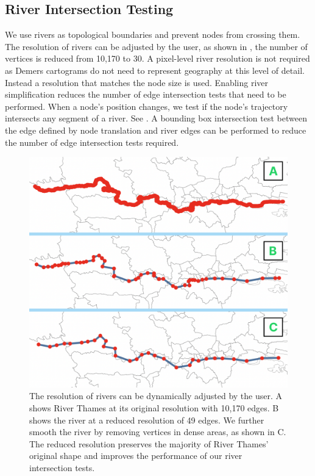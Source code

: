     

\subsection{River Intersection Testing}

We use rivers as topological boundaries and prevent nodes from crossing them. The resolution of rivers can be adjusted by the user, as shown in , the number of vertices is reduced from 10,170 to 30. A pixel-level river resolution is not required as Demers cartograms do not need to represent geography at this level of detail. Instead a resolution that matches the node size is used. Enabling river simplification reduces the number of edge intersection tests that need to be performed. When a node's position changes, we test if the node's trajectory intersects any segment of a river. See . A bounding box intersection test between the edge defined by node translation and river edges can be performed to reduce the number of edge intersection tests required.


{
\begin{figure}[tb!]
    \centering
    \includegraphics[width=\columnwidth]{figure/river_resolution.png}
    \caption{The resolution of rivers can be dynamically adjusted by the user. A shows River Thames at its original resolution with 10,170 edges. B shows the river at a reduced resolution of 49 edges. We further smooth the river by removing vertices in dense areas, as shown in C. The reduced resolution preserves the majority of River Thames' original shape and improves the performance of our river intersection tests.}
    \label{fig:river resolution}
\end{figure}
}

